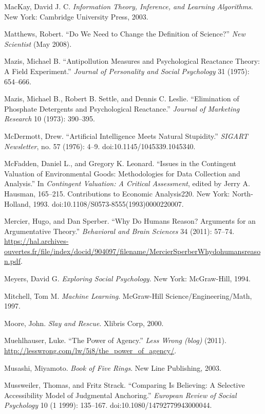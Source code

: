 \documentclass[letterpaper]{book}
\begin{document}
{
 MacKay, David J. C. \textit{Information Theory, Inference, and
Learning Algorithms}. New York: Cambridge University Press, 2003.}

{
 Matthews, Robert. ``Do We Need to Change the
Definition of Science?'' \textit{New Scientist} (May
2008).}

{
 Mazis, Michael B. ``Antipollution Measures and
Psychological Reactance Theory: A Field Experiment.''
\textit{Journal of Personality and Social Psychology} 31 (1975):
654--666.}

{
 Mazis, Michael B., Robert B. Settle, and Dennis C. Leslie.
``Elimination of Phosphate Detergents and
Psychological Reactance.'' \textit{Journal of
Marketing Research} 10 (1973): 390--395.}

{
 McDermott, Drew. ``Artificial Intelligence Meets
Natural Stupidity.'' \textit{SIGART Newsletter}, no.
57 (1976): 4--9. doi:10.1145/1045339.1045340.}

{
 McFadden, Daniel L., and Gregory K. Leonard.
``Issues in the Contingent Valuation of Environmental
Goods: Methodologies for Data Collection and
Analysis.'' In \textit{Contingent Valuation: A
Critical Assessment}, edited by Jerry A. Hausman, 165--215.
Contributions to Economic Analysis220. New York: North-Holland, 1993.
doi:10.1108/S0573-8555(1993)0000220007.}

{
 Mercier, Hugo, and Dan Sperber. ``Why Do Humans
Reason? Arguments for an Argumentative Theory.''
\textit{Behavioral and Brain Sciences} 34 (2011): 57--74.
\url{https://hal.archives-ouvertes.fr/file/index/docid/904097/filename/MercierSperberWhydohumansreason.pdf}.}

{
 Meyers, David G. \textit{Exploring Social Psychology}. New York:
McGraw-Hill, 1994.}

{
 Mitchell, Tom M. \textit{Machine Learning}. McGraw-Hill
Science/Engineering/Math, 1997.}

{
 Moore, John. \textit{Slay and Rescue}. Xlibris Corp, 2000.}

{
 Muehlhauser, Luke. ``The Power of
Agency.'' \textit{Less Wrong (blog)} (2011).
\url{http://lesswrong.com/lw/5i8/the\_power\_of\_agency/}.}

{
 Musashi, Miyamoto. \textit{Book of Five Rings}. New Line
Publishing, 2003.}

{
 Mussweiler, Thomas, and Fritz Strack. ``Comparing
Is Believing: A Selective Accessibility Model of Judgmental
Anchoring.'' \textit{European Review of Social
Psychology} 10 (1 1999): 135--167. doi:10.1080/14792779943000044.}
\end{document}
